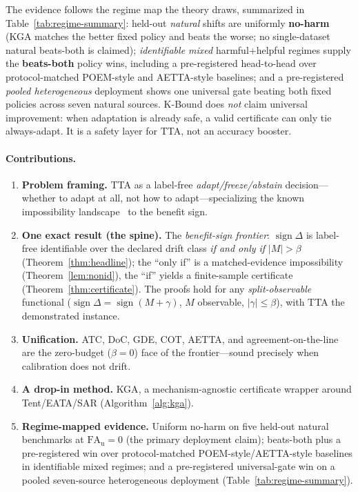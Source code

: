 \documentclass[conference]{IEEEtran}
\theoremstyle{plain}
\theoremstyle{definition}
\theoremstyle{remark}
\newcommand{\sign}{\operatorname{sign}}
\begin{document}
The evidence follows the regime map the theory draws, summarized in
Table~\ref{tab:regime-summary}: held-out \emph{natural} shifts are uniformly \textbf{no-harm}
(\textsc{KGA} matches the better fixed policy and beats the worse; no single-dataset natural
beats-both is claimed); \emph{identifiable mixed} harmful+helpful regimes supply the
\textbf{beats-both} policy wins, including a pre-registered head-to-head over protocol-matched
POEM-style and AETTA-style baselines; and a pre-registered \emph{pooled heterogeneous}
deployment shows one universal gate beating both fixed policies across seven natural sources.
K-Bound does \emph{not} claim universal improvement: when adaptation is already safe, a valid
certificate can only tie always-adapt. It is a safety layer for TTA, not an accuracy booster.

\paragraph{Contributions.}
\begin{enumerate}
\item \textbf{Problem framing.} TTA as a label-free \emph{adapt/freeze/abstain} decision---whether
to adapt at all, not how to adapt---specializing the known impossibility
landscape~\cite{garg2022atc,kalai2021abstain} to the benefit sign.
\item \textbf{One exact result (the spine).} The \emph{benefit-sign frontier}: $\sign\Delta$ is
label-free identifiable over the declared drift class \emph{if and only if} $|M|>\beta$
(Theorem~\ref{thm:headline}); the ``only if'' is a matched-evidence impossibility
(Theorem~\ref{lem:nonid}), the ``if'' yields a finite-sample certificate
(Theorem~\ref{thm:certificate}). The proofs hold for any \emph{split-observable} functional
($\sign\Delta=\sign(M+\gamma)$, $M$ observable, $|\gamma|\le\beta$), with TTA the demonstrated
instance.
\item \textbf{Unification.} ATC, DoC, GDE, COT, AETTA, and agreement-on-the-line are the
zero-budget ($\beta{=}0$) face of the frontier---sound precisely when calibration does not drift.
\item \textbf{A drop-in method.} \textsc{KGA}, a mechanism-agnostic certificate wrapper around
Tent/EATA/SAR (Algorithm~\ref{alg:kga}).
\item \textbf{Regime-mapped evidence.} Uniform no-harm on five held-out natural benchmarks at
$\mathrm{FA}_{\mathrm u}{=}0$ (the primary deployment claim); beats-both plus a pre-registered
win over protocol-matched POEM-style/AETTA-style baselines in identifiable mixed regimes; and a
pre-registered universal-gate win on a pooled seven-source heterogeneous deployment
(Table~\ref{tab:regime-summary}).
\end{enumerate}
\end{document}
